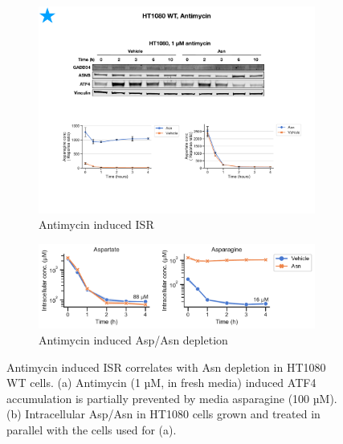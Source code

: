 \begin{figure}[ht]
     \centering
     \begin{subfigure}[b]{0.6\textwidth}
         \includegraphics[width=\textwidth]{figures/chap2/HT1080_Anti_ATF4_western.pdf}
         \caption{Antimycin induced ISR}
         \label{fig:ch2:HT1080_Anti_ATF4_western}
     \end{subfigure}
     \hfill
     \begin{subfigure}[b]{0.85\textwidth}
         \includegraphics[width=\textwidth]{figures/chap2/HT1080_Anti_Asp_Asn.pdf}
         \caption{Antimycin induced Asp/Asn depletion}
         \label{fig:ch2:HT1080_Anti_Asp_Asn}
     \end{subfigure}
     \hfill
        \caption[Antimycin induced ISR correlates with Asn depletion]{
        Antimycin induced ISR correlates with Asn depletion in HT1080 WT cells.
        (a) Antimycin (1 µM, in fresh media) induced ATF4 accumulation is partially prevented by media asparagine (100 µM).
        (b) Intracellular Asp/Asn in HT1080 cells grown and treated in parallel with the cells used for (a).
        }
        \label{fig:ch2:ISR_resc}
\end{figure}




